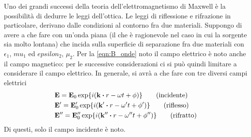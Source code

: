 Uno dei grandi successi della teoria dell'elettromagnetismo di Maxwell è
la possibilità di dedurre le leggi dell'ottica.
Le leggi di riflessione e rifrazione in particolare, derivano dalle condizioni al
contorno fra due materiali.
Suppongo di avere a che fare con un'onda piana (il che è ragionevole nel caso
in cui la sorgente sia molto lontana) che incida sulla superficie di
separazione fra due materiali con $\epsilon_1$, $mu_1$ ed $epsilon_2$, $\mu_2$.
Per la \eqref{eqn:B_onde} noto il campo elettrico è noto anche il campo magnetico:
per le successive considerazioni ci si può quindi limitare a considerare il campo
elettrico. In generale, si avrà a che fare con tre diversi campi elettrici
\[
\begin{split}
&\vb{E}=\vb{E}_0 \exp {i(\vb{k}\vdot{r}-\omega t +\phi)} \quad\quad \text{(incidente)}\\
&\vb{E}'=\vb{E}'_0 \exp {i(\vb{k}'\vdot{r}-\omega' t +\phi')} \quad\quad \text{(riflesso)}\\
&\vb{E}''=\vb{E}''_0 \exp {i(\vb{k}''\vdot{r}-\omega'' t +\phi'')} \quad\quad \text{(rifratto)}\\
\end{split}
\]
Di questi, solo il campo incidente è noto.

